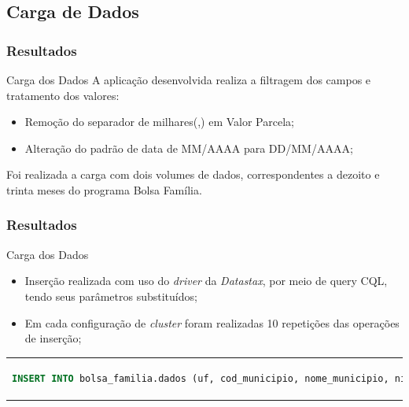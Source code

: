\documentclass[brazil]{beamer}
\begin{document}
\subsection{Carga de Dados}
\begin{frame}
	\frametitle{Resultados}
	\begin{block}{Carga dos Dados}
		A aplicação desenvolvida realiza a filtragem dos campos e tratamento dos valores:
		\begin{itemize}
			\item Remoção do separador de milhares(,) em Valor Parcela;
			\item Alteração do padrão de data de MM/AAAA para DD/MM/AAAA;		
		\end{itemize}
	
		Foi realizada a carga com dois volumes de dados, correspondentes a dezoito e trinta meses do programa Bolsa Família.
		\begin{table}
			\centering
			\caption{Volume de dados}
		\end{table}	
	\end{block}
\end{frame}

\begin{frame}[fragile]
	\frametitle{Resultados}
	\begin{block}{Carga dos Dados}
	\begin{itemize}
		\item Inserção realizada com uso do \emph{driver} da 	\emph{Datastax}, por meio de query CQL, tendo seus parâmetros substituídos;
		\item Em cada configuração de \emph{cluster} foram realizadas 10 repetições das operações de inserção;		
	\end{itemize}

	
	\begin{tabular}{c}
		\begin{lstlisting}[caption={Código CQL para inserção},language=SQL]
			INSERT INTO bolsa_familia.dados (uf, cod_municipio, nome_municipio, nis_favorecido, nome_favorecido, fonte, valor, periodo) VALUES (?, ?, ?, ?, ?, ?, ?, ?)
		\end{lstlisting}
	\end{tabular}
	\end{block}
\end{frame}
\end{document}
